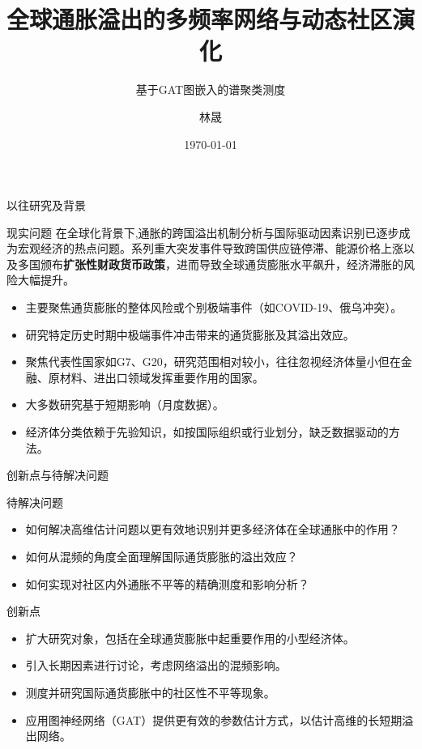 \documentclass{beamer}
\title{全球通胀溢出的多频率网络与动态社区演化}
\subtitle{基于GAT图嵌入的谱聚类测度}
\author{林晟}
\institute{统计学院}
\date{\today}
\begin{document}
\frame{\titlepage}

\begin{frame}{以往研究及背景}
  \begin{block}{现实问题}
    在全球化背景下,通胀的跨国溢出机制分析与国际驱动因素识别已逐步成为宏观经济的热点问题。系列重大突发事件导致跨国供应链停滞、能源价格上涨以及多国颁布\textbf{扩张性财政货币政策}，进而导致全球通货膨胀水平飙升，经济滞胀的风险大幅提升。
  \end{block}

  \begin{itemize}
    \item 主要聚焦通货膨胀的整体风险或个别极端事件（如COVID-19、俄乌冲突）。
    \item 研究特定历史时期中极端事件冲击带来的通货膨胀及其溢出效应。
    \item 聚焦代表性国家如G7、G20，研究范围相对较小，往往忽视经济体量小但在金融、原材料、进出口领域发挥重要作用的国家。
    \item 大多数研究基于短期影响（月度数据）。
    \item 经济体分类依赖于先验知识，如按国际组织或行业划分，缺乏数据驱动的方法。
  \end{itemize}
\end{frame}


\begin{frame}{创新点与待解决问题}
  \begin{block}{待解决问题}
    \begin{itemize}
      \item 如何解决高维估计问题以更有效地识别并更多经济体在全球通胀中的作用？
      \item 如何从混频的角度全面理解国际通货膨胀的溢出效应？
      \item 如何实现对社区内外通胀不平等的精确测度和影响分析？
    \end{itemize}
    \vspace{0.2cm}
  \begin{block}{创新点}
    \begin{itemize}
      \item 扩大研究对象，包括在全球通货膨胀中起重要作用的小型经济体。
      \item 引入长期因素进行讨论，考虑网络溢出的混频影响。
      \item 测度并研究国际通货膨胀中的社区性不平等现象。
      \item 应用图神经网络（GAT）提供更有效的参数估计方式，以估计高维的长短期溢出网络。
    \end{itemize}
  \end{block}


  \end{block}
\end{frame}
\end{document}
